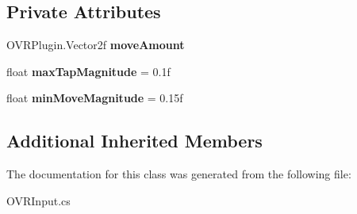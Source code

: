 \subsection*{Private Attributes}
\begin{DoxyCompactItemize}
\item 
\mbox{\label{class_o_v_r_input_1_1_o_v_r_controller_touchpad_aece3a727a1059f2e187a8c5e2a97f7c4}} 
O\+V\+R\+Plugin.\+Vector2f {\bfseries move\+Amount}
\item 
\mbox{\label{class_o_v_r_input_1_1_o_v_r_controller_touchpad_a04eb06ef522ca71e5f22a6bee0162d30}} 
float {\bfseries max\+Tap\+Magnitude} = 0.\+1f
\item 
\mbox{\label{class_o_v_r_input_1_1_o_v_r_controller_touchpad_a425b140c0cddc3071ed2f4df77640814}} 
float {\bfseries min\+Move\+Magnitude} = 0.\+15f
\end{DoxyCompactItemize}
\subsection*{Additional Inherited Members}


The documentation for this class was generated from the following file\+:\begin{DoxyCompactItemize}
\item 
O\+V\+R\+Input.\+cs\end{DoxyCompactItemize}
